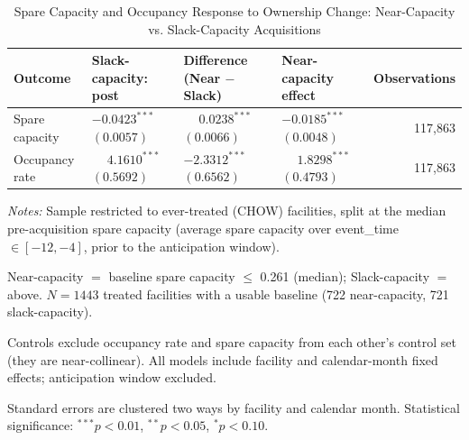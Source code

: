 \documentclass[11pt]{article}
\begin{document}
\begin{table}[!ht]
\centering
\begin{threeparttable}
\caption{Spare Capacity and Occupancy Response to Ownership Change: Near-Capacity vs. Slack-Capacity Acquisitions}
\label{tab:spare-capacity-near-vs-slack-static}
\small
\setlength{\tabcolsep}{6pt}
\begin{tabularx}{\textwidth}{@{} l Y Y Y r @{}}
\toprule
Outcome & Slack-capacity: post & Difference (Near $-$ Slack) & Near-capacity effect & Observations \\
\midrule
Spare capacity &  &  &  & 117,863 \\
Occupancy rate &  &  &  & 117,863 \\
\bottomrule
\end{tabularx}
\begin{tablenotes}[flushleft]
\footnotesize
\item \textit{Notes:} Sample restricted to ever-treated (CHOW) facilities, split at the median pre-acquisition spare capacity (average spare capacity over event\_time $\in [-12,-4]$, prior to the anticipation window).
\item Near-capacity $=$ baseline spare capacity $\leq$ 0.261 (median); Slack-capacity $=$ above. $N = 1443$ treated facilities with a usable baseline (722 near-capacity, 721 slack-capacity).
\item Controls exclude occupancy rate and spare capacity from each other's control set (they are near-collinear). All models include facility and calendar-month fixed effects; anticipation window excluded.
\item Standard errors are clustered two ways by facility and calendar month. Statistical significance: $^{***}p<0.01$, $^{**}p<0.05$, $^{*}p<0.10$.
\end{tablenotes}
\end{threeparttable}
\end{table}
\end{document}
